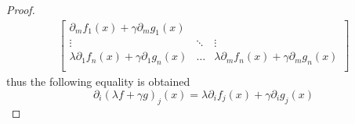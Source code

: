 \begin{proof}
{\begin{align*}
\begin{bmatrix}
                    \partial_m f_1(x) + \gamma \partial_m g_1(x)                            \\
                    \vdots                                               & \ddots & \vdots  \\
                    \lambda \partial_1 f_n(x) + \gamma \partial_1 g_n(x) & \dots  & \lambda
                    \partial_m f_n(x) + \gamma \partial_m g_n(x)                            \\
                \end{bmatrix}
            \end{align*}
        }%
    thus the following equality is obtained
    \[
        \partial_i (\lambda f + \gamma g)_j(x) = \lambda \partial_i f_j(x) + \gamma
        \partial_i g_j(x)
    \]
\end{proof}


